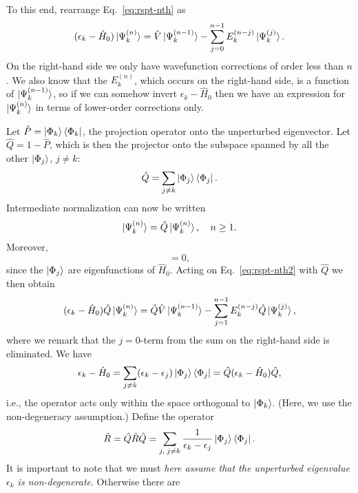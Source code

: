 \documentclass{report}
\theoremstyle{plain}
\theoremstyle{definition}
\begin{document}
To this end, rearrange Eq.~\eqref{eq:rspt-nth} as
\begin{equation}
  (\epsilon_k - \hat{H}_0 )\ket{\Psi_k^{(n)}} = \hat{V}
  \ket{\Psi_k^{(n-1)}} - \sum_{j=0}^{n-1}
  E_k^{(n-j)} \ket{\Psi_k^{(j)}}. \label{eq:rspt-nth2}
\end{equation}
On the right-hand side we only have wavefunction corrections of order
less than $n$. We also know that the $E_k^{(n)}$, which occurs on the
right-hand side, is a function of $\ket{\Psi_k^{(n-1)}}$, so if we can
somehow invert $\epsilon_k - \hat{H}_0$ then we have an expression for
$\ket{\Psi_k^{(n)}}$ in terms of lower-order corrections only.

Let $\hat{P} = \ket{\Phi_k}\bra{\Phi_k}$, the projection operator onto
the unperturbed eigenvector. Let $\hat{Q} = 1 - \hat{P}$, which is
then the projector onto the subspace spanned by all the other
$\ket{\Phi_j}$, $j\neq k$:
\begin{equation}
  \hat{Q} = \sum_{j\neq k} \ket{\Phi_j}\bra{\Phi_j}.
\end{equation}
Intermediate normalization can now be written
\begin{equation}
  \ket{\Psi_k^{(n)}} = \hat{Q}\ket{\Psi_k^{(n)}}, \quad n \geq 1.
\end{equation}
Moreover,
\begin{equation}
  [\hat{H}_0,\hat{Q}] = 0,
\end{equation}
since the $\ket{\Phi_j}$ are eigenfunctions of $\hat{H}_0$. Acting
on Eq.~\eqref{eq:rspt-nth2} with $\hat{Q}$ we then obtain
\begin{equation}
  (\epsilon_k - \hat{H}_0)\hat{Q}\ket{\Psi_k^{(n)}} = 
  \hat{Q}\hat{V} \ket{\Psi_k^{(n-1)}} - \sum_{j=1}^{n-1} E_k^{(n-j)} \hat{Q}\ket{\Psi_k^{(j)}},
\end{equation}
where we remark that the $j=0$-term from the sum on the right-hand
side is eliminated.
We have
\begin{equation}
  \epsilon_k - \hat{H}_0 = \sum_{j\neq k} (\epsilon_k -
  \epsilon_j)\ket{\Phi_j}\bra{\Phi_j} = \hat{Q}(\epsilon_k - \hat{H}_0)\hat{Q},
\end{equation}
i.e., the operator acts only within the space orthogonal to
$\ket{\Phi_k}$. (Here, we use the non-degeneracy assumption.)
Define the operator
\begin{equation}
  \hat{R} = \hat{Q}\hat{R}\hat{Q} = \sum_{j, \;j\neq k} \frac{1}{\epsilon_k - \epsilon_j}
  \ket{\Phi_j}\bra{\Phi_j} .
\end{equation}
It is important to note that we must \emph{here assume that the unperturbed
  eigenvalue $\epsilon_k$ is non-degenerate}. Otherwise there are
\end{document}
